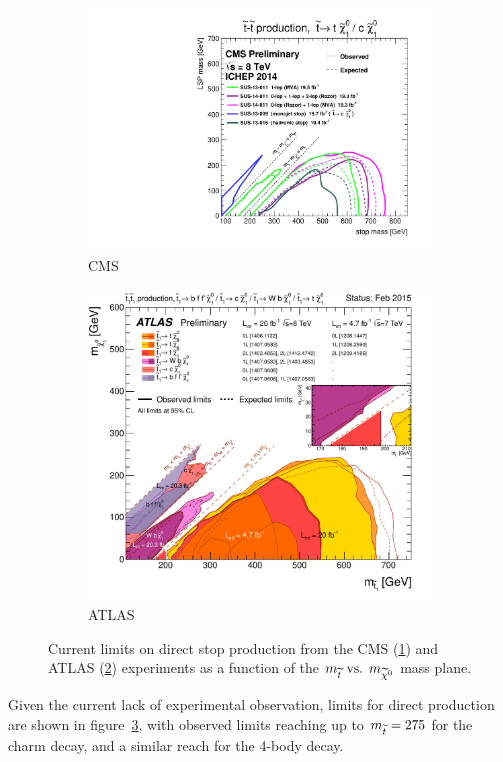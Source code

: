 \begin{figure}[h!]
  \centering
  \begin{subfigure}[b]{0.46\textwidth} %
    \includegraphics[width=\textwidth]{Figs/other_limits/T2tt_ICHEP2014_All.pdf}
    \caption{CMS}
    \label{fig:cms_current_limit}
  \end{subfigure}
  \begin{subfigure}[b]{0.46\textwidth}
    \includegraphics[width=\textwidth]{Figs/other_limits/ATLAS_SUSY_Stop_tLSP.pdf}
    \caption{ATLAS}
    \label{fig:atlas_current_limit}
  \end{subfigure}
  \caption{Current limits on direct stop production from the CMS
  (\ref{fig:cms_current_limit})\cite{cmssusyresults} and ATLAS
  (\ref{fig:atlas_current_limit})\cite{atlassusyresults}
  experiments as a function of the $m_{\widetilde{t}} \text{ vs. } m_{\widetilde{\chi}^{0}}$ mass
  plane.}
  \label{fig:current_limits}
\end{figure}

Given the current lack of experimental observation, limits for direct \sTop
production are shown in figure~\ref{fig:current_limits}, with observed limits
reaching up to $m_{\widetilde{t}} = 275$ \gev for the charm decay, and a similar reach
for the 4-body decay.